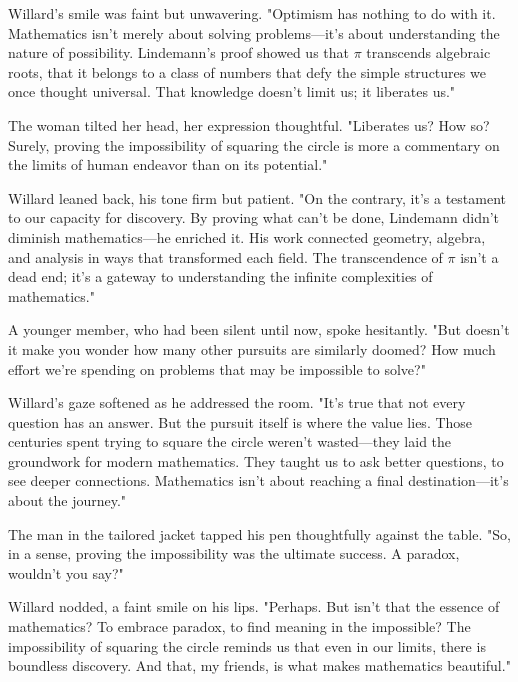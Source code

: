 \smallskip

Willard’s smile was faint but unwavering.  
"Optimism has nothing to do with it. Mathematics isn’t merely about solving problems—it’s about understanding the nature of possibility. Lindemann’s proof showed us that \(\pi\) transcends algebraic roots, that it belongs to a class of numbers that defy the simple structures we once thought universal. That knowledge doesn’t limit us; it liberates us."

\smallskip

The woman tilted her head, her expression thoughtful.  
"Liberates us? How so? Surely, proving the impossibility of squaring the circle is more a commentary on the limits of human endeavor than on its potential."

\smallskip

Willard leaned back, his tone firm but patient.  
"On the contrary, it’s a testament to our capacity for discovery. By proving what can’t be done, Lindemann didn’t diminish mathematics—he enriched it. His work connected geometry, algebra, and analysis in ways that transformed each field. The transcendence of \(\pi\) isn’t a dead end; it’s a gateway to understanding the infinite complexities of mathematics."

\smallskip

A younger member, who had been silent until now, spoke hesitantly.  
"But doesn’t it make you wonder how many other pursuits are similarly doomed? How much effort we’re spending on problems that may be impossible to solve?"

\smallskip

Willard’s gaze softened as he addressed the room.  
"It’s true that not every question has an answer. But the pursuit itself is where the value lies. Those centuries spent trying to square the circle weren’t wasted—they laid the groundwork for modern mathematics. They taught us to ask better questions, to see deeper connections. Mathematics isn’t about reaching a final destination—it’s about the journey."

\smallskip

The man in the tailored jacket tapped his pen thoughtfully against the table.  
"So, in a sense, proving the impossibility was the ultimate success. A paradox, wouldn’t you say?"

\smallskip

Willard nodded, a faint smile on his lips.  
"Perhaps. But isn’t that the essence of mathematics? To embrace paradox, to find meaning in the impossible? The impossibility of squaring the circle reminds us that even in our limits, there is boundless discovery. And that, my friends, is what makes mathematics beautiful."

